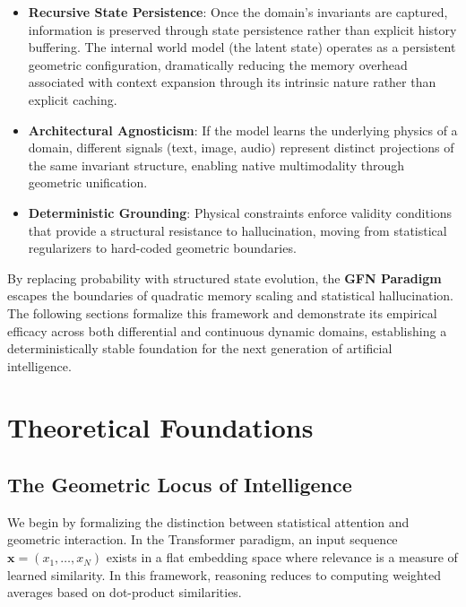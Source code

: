 \documentclass[12pt,a4paper]{article}
\begin{document}
\begin{itemize}
    \item \textbf{Recursive State Persistence}: Once the domain's invariants are captured, information is preserved through state persistence rather than explicit history buffering. The internal world model (the latent state) operates as a persistent geometric configuration, dramatically reducing the memory overhead associated with context expansion through its intrinsic nature rather than explicit caching.

    \item \textbf{Architectural Agnosticism}: If the model learns the underlying physics of a domain, different signals (text, image, audio) represent distinct projections of the same invariant structure, enabling native multimodality through geometric unification.

    \item \textbf{Deterministic Grounding}: Physical constraints enforce validity conditions that provide a structural resistance to hallucination, moving from statistical regularizers to hard-coded geometric boundaries.
\end{itemize}

By replacing probability with structured state evolution, the \textbf{GFN Paradigm} escapes the boundaries of quadratic memory scaling and statistical hallucination. The following sections formalize this framework and demonstrate its empirical efficacy across both differential and continuous dynamic domains, establishing a deterministically stable foundation for the next generation of artificial intelligence.

\section{Theoretical Foundations}
\label{sec:theoretical-foundations}

\subsection{The Geometric Locus of Intelligence}
\label{sec:semantic-geometry}

We begin by formalizing the distinction between statistical attention and geometric interaction. In the Transformer paradigm, an input sequence $\mathbf{x} = (x_1, \dots, x_N)$ exists in a flat embedding space where relevance is a measure of learned similarity. In this framework, reasoning reduces to computing weighted averages based on dot-product similarities.
\end{document}
